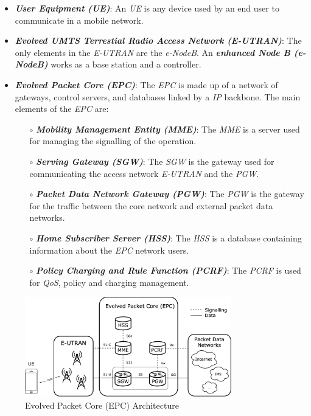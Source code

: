 \begin{itemize}
  \item \textbf{\textit{User Equipment (UE)}}: An \textit{UE} is any device used by an end user
  to communicate in a mobile network.
  \item \textbf{\textit{Evolved UMTS Terrestial Radio Access Network (E-UTRAN)}}: The only elements
  in the \textit{E-UTRAN} are the \textit{e-NodeB}. An \textit{\textbf{enhanced Node B (e-NodeB)}} works as a base station
  and a controller.
  \item \textbf{\textit{Evolved Packet Core (EPC)}}: The \textit{EPC} is made up of a network of gateways, 
  control servers, and databases linked by a \textit{IP} backbone. The main elements of the \textit{EPC}
  are:
  \begin{itemize}
    \item[$\circ$] \textit{\textbf{Mobility Management Entity (MME)}}: The \textit{MME} is a server 
    used for managing the signalling of the operation. 
    \item[$\circ$] \textit{\textbf{Serving Gateway (SGW)}}: The \textit{SGW} is the gateway used for
    communicating the access network \textit{E-UTRAN} and the \textit{PGW}.
    \item[$\circ$] \textit{\textbf{Packet Data Network Gateway (PGW)}}: The \textit{PGW} is the gateway
    for the traffic between the core network and external packet data networks. 
    \item[$\circ$] \textit{\textbf{Home Subscriber Server (HSS)}}: The \textit{HSS} is a database 
    containing information about the \textit{EPC} network users.  
    \item[$\circ$] \textit{\textbf{Policy Charging and Rule Function (PCRF)}}: The \textit{PCRF} is used
    for \textit{QoS}, policy and charging management. 
  \end{itemize}
\end{itemize}

\begin{figure}[h]
  \centering
  \includegraphics[width=0.8\textwidth]{img/epc.png}
  \caption{Evolved Packet Core (EPC) Architecture}
  \label{fig:epc}
\end{figure}


